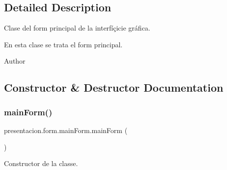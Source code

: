 \subsection{Detailed Description}
Clase del form principal de la interfíçicie gráfica. 

En esta clase se trata el form principal.

\begin{DoxyAuthor}{Author}

\end{DoxyAuthor}


\subsection{Constructor \& Destructor Documentation}
\mbox{\label{classpresentacion_1_1form_1_1mainForm_ac1236f4bc250bf2f5a4a01a072e77555}} 
\subsubsection{\texorpdfstring{main\+Form()}{mainForm()}}
{\footnotesize\ttfamily presentacion.\+form.\+main\+Form.\+main\+Form (\begin{DoxyParamCaption}{ }\end{DoxyParamCaption})\hspace{0.3cm}{\ttfamily [inline]}}



Constructor de la classe. 


